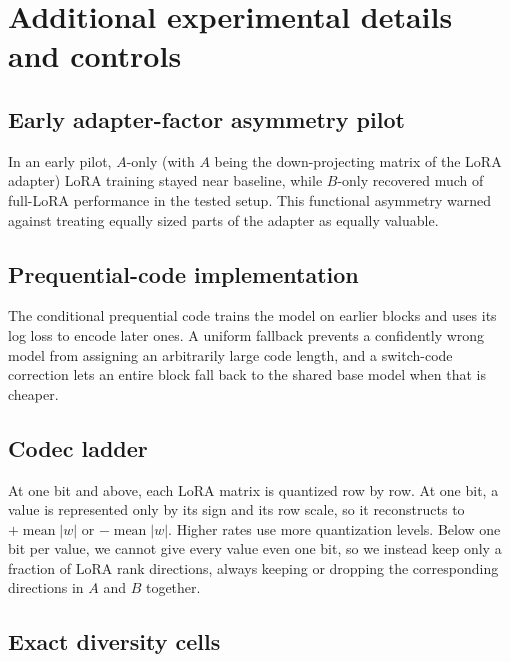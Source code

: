 \section{Additional experimental details and controls}
\label{sec:appendix-controls}

\subsection{Early adapter-factor asymmetry pilot}

In an early pilot, $A$-only (with $A$ being the down-projecting matrix of the LoRA adapter) LoRA training stayed near baseline, while $B$-only recovered much of full-LoRA performance in the tested setup. This functional asymmetry warned against treating equally sized parts of the adapter as equally valuable.

\subsection{Prequential-code implementation}
\label{app:prequential-code}

The conditional prequential code trains the model on earlier blocks and uses its log loss to encode later ones. A uniform fallback prevents a confidently wrong model from assigning an arbitrarily large code length, and a switch-code correction lets an entire block fall back to the shared base model when that is cheaper.

\subsection{Codec ladder}
\label{app:codec-ladder}

At one bit and above, each LoRA matrix is quantized row by row. At one bit, a value is represented only by its sign and its row scale, so it reconstructs to $+\operatorname{mean}|w|$ or $-\operatorname{mean}|w|$. Higher rates use more quantization levels. Below one bit per value, we cannot give every value even one bit, so we instead keep only a fraction of LoRA rank directions, always keeping or dropping the corresponding directions in $A$ and $B$ together.

\subsection{Exact diversity cells}

